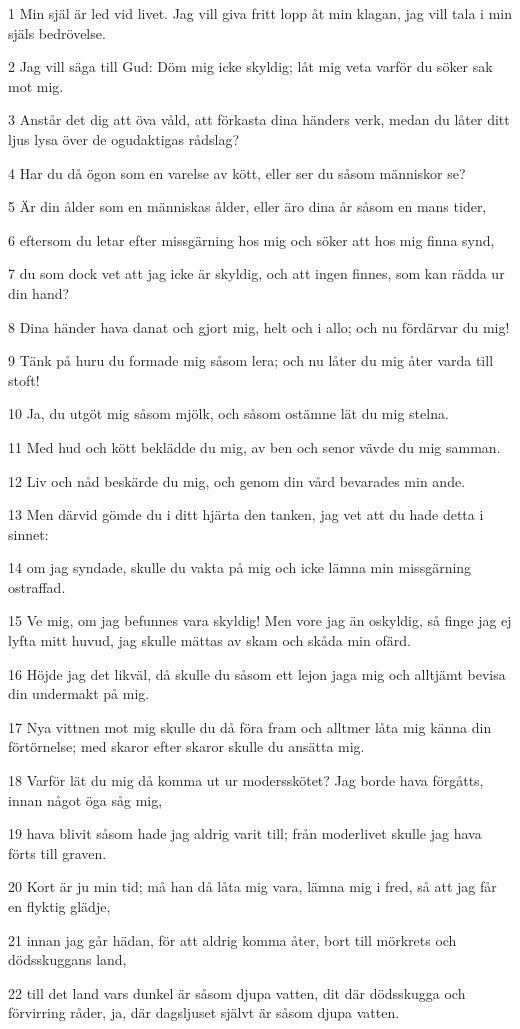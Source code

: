\par 1 Min själ är led vid livet. Jag vill giva fritt lopp åt min klagan, jag vill tala i min själs bedrövelse.
\par 2 Jag vill säga till Gud: Döm mig icke skyldig; låt mig veta varför du söker sak mot mig.
\par 3 Anstår det dig att öva våld, att förkasta dina händers verk, medan du låter ditt ljus lysa över de ogudaktigas rådslag?
\par 4 Har du då ögon som en varelse av kött, eller ser du såsom människor se?
\par 5 Är din ålder som en människas ålder, eller äro dina år såsom en mans tider,
\par 6 eftersom du letar efter missgärning hos mig och söker att hos mig finna synd,
\par 7 du som dock vet att jag icke är skyldig, och att ingen finnes, som kan rädda ur din hand?
\par 8 Dina händer hava danat och gjort mig, helt och i allo; och nu fördärvar du mig!
\par 9 Tänk på huru du formade mig såsom lera; och nu låter du mig åter varda till stoft!
\par 10 Ja, du utgöt mig såsom mjölk, och såsom ostämne lät du mig stelna.
\par 11 Med hud och kött beklädde du mig, av ben och senor vävde du mig samman.
\par 12 Liv och nåd beskärde du mig, och genom din vård bevarades min ande.
\par 13 Men därvid gömde du i ditt hjärta den tanken, jag vet att du hade detta i sinnet:
\par 14 om jag syndade, skulle du vakta på mig och icke lämna min missgärning ostraffad.
\par 15 Ve mig, om jag befunnes vara skyldig! Men vore jag än oskyldig, så finge jag ej lyfta mitt huvud, jag skulle mättas av skam och skåda min ofärd.
\par 16 Höjde jag det likväl, då skulle du såsom ett lejon jaga mig och alltjämt bevisa din undermakt på mig.
\par 17 Nya vittnen mot mig skulle du då föra fram och alltmer låta mig känna din förtörnelse; med skaror efter skaror skulle du ansätta mig.
\par 18 Varför lät du mig då komma ut ur modersskötet? Jag borde hava förgåtts, innan något öga såg mig,
\par 19 hava blivit såsom hade jag aldrig varit till; från moderlivet skulle jag hava förts till graven.
\par 20 Kort är ju min tid; må han då låta mig vara, lämna mig i fred, så att jag får en flyktig glädje,
\par 21 innan jag går hädan, för att aldrig komma åter, bort till mörkrets och dödsskuggans land,
\par 22 till det land vars dunkel är såsom djupa vatten, dit där dödsskugga och förvirring råder, ja, där dagsljuset självt är såsom djupa vatten.

